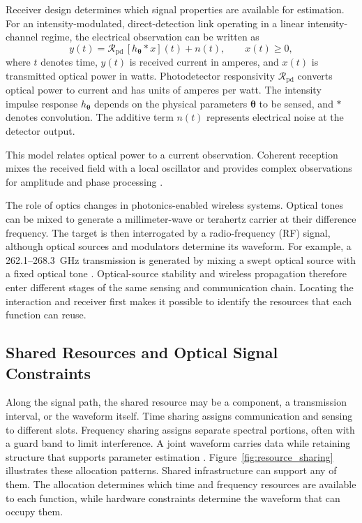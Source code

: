 Receiver design determines which signal properties are available for
estimation. For an intensity-modulated, direct-detection link operating in a
linear intensity-channel regime, the electrical observation can be written as
\begin{equation}
y(t)=\mathcal{R}_{\mathrm{pd}}\,[h_{\boldsymbol{\theta}}*x](t)+n(t),
\qquad x(t)\geq 0,
\label{eq:imdd_observation}
\end{equation}
where $t$ denotes time, $y(t)$ is received current in amperes, and $x(t)$ is
transmitted optical power in watts. Photodetector responsivity
$\mathcal{R}_{\mathrm{pd}}$ converts optical power to current and has units of
amperes per watt. The intensity impulse response $h_{\boldsymbol{\theta}}$
depends on the physical parameters $\boldsymbol{\theta}$ to be sensed, and
$*$ denotes convolution. The additive term $n(t)$ represents electrical
noise at the detector output.

This model relates optical power to a current observation. Coherent reception mixes the
received field with a local oscillator and provides complex observations for
amplitude and phase processing
\cite{Wen2024OISACArchitectures,OISAC_SCR00057}.

The role of optics changes in photonics-enabled wireless systems. Optical
tones can be mixed to generate a millimeter-wave or terahertz carrier at their
difference frequency. The target is then interrogated by a radio-frequency
(RF) signal, although
optical sources and modulators determine its waveform. For example, a
262.1--268.3~GHz transmission is generated by mixing a swept optical source
with a fixed optical tone \cite{OISAC_SCR00083}. Optical-source stability and
wireless propagation therefore enter different stages of the same sensing
and communication chain. Locating the interaction and receiver first makes
it possible to identify the resources that each function can reuse.

\subsection{Shared Resources and Optical Signal Constraints}
\label{sec:shared_resources_constraints}

Along the signal path, the shared resource may be a component, a transmission
interval, or the waveform itself. Time sharing assigns communication and sensing to different
slots. Frequency sharing assigns separate spectral portions, often with a
guard band to limit interference. A joint waveform carries data while
retaining structure that supports parameter estimation
\cite{Wen2024OISACArchitectures,Lyu2026PhotonicTHzWaveforms}.
Figure~\ref{fig:resource_sharing} illustrates these allocation patterns.
Shared infrastructure can support any of them. The allocation determines
which time and frequency resources are available to each function, while
hardware constraints determine the waveform that can occupy them.

